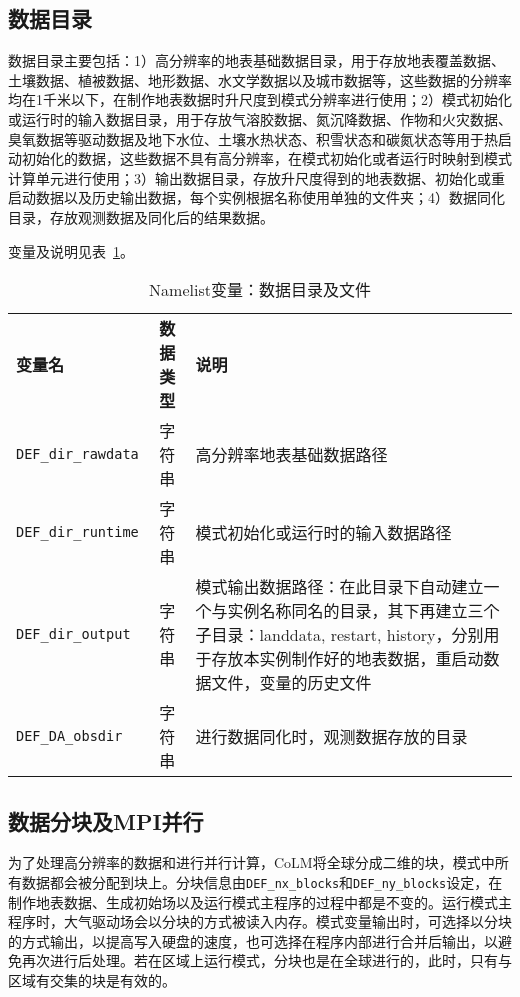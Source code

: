 \subsection{数据目录}

数据目录主要包括：1）高分辨率的地表基础数据目录，用于存放地表覆盖数据、土壤数据、植被数据、地形数据、水文学数据以及城市数据等，这些数据的分辨率均在1千米以下，在制作地表数据时升尺度到模式分辨率进行使用；2）模式初始化或运行时的输入数据目录，用于存放气溶胶数据、氮沉降数据、作物和火灾数据、臭氧数据等驱动数据及地下水位、土壤水热状态、积雪状态和碳氮状态等用于热启动初始化的数据，这些数据不具有高分辨率，在模式初始化或者运行时映射到模式计算单元进行使用；3）输出数据目录，存放升尺度得到的地表数据、初始化或重启动数据以及历史输出数据，每个实例根据名称使用单独的文件夹；4）数据同化目录，存放观测数据及同化后的结果数据。

变量及说明见表~\ref{table_nl_dir_file}。

\begin{table}[!htbp] \small
\caption{Namelist变量：数据目录及文件} \label{table_nl_dir_file}
\centering \renewcommand{\arraystretch}{1.2}
\begin{tabular}{lcp{}}
\toprule
\textbf{变量名} & \textbf{数据类型} & \textbf{说明} \\
\texttt{DEF\_dir\_rawdata} & 字符串 & 高分辨率地表基础数据路径 \\
\texttt{DEF\_dir\_runtime} & 字符串 & 模式初始化或运行时的输入数据路径 \\
\texttt{DEF\_dir\_output} & 字符串 & 模式输出数据路径：在此目录下自动建立一个与实例名称同名的目录，其下再建立三个子目录：landdata, restart, history，分别用于存放本实例制作好的地表数据，重启动数据文件，变量的历史文件 \\
\texttt{DEF\_DA\_obsdir} & 字符串 & 进行数据同化时，观测数据存放的目录 \\
\bottomrule
\end{tabular}
\end{table}

\subsection{数据分块及MPI并行}

为了处理高分辨率的数据和进行并行计算，CoLM将全球分成二维的块，模式中所有数据都会被分配到块上。分块信息由\texttt{DEF\_nx\_blocks}和\texttt{DEF\_ny\_blocks}设定，在制作地表数据、生成初始场以及运行模式主程序的过程中都是不变的。运行模式主程序时，大气驱动场会以分块的方式被读入内存。模式变量输出时，可选择以分块的方式输出，以提高写入硬盘的速度，也可选择在程序内部进行合并后输出，以避免再次进行后处理。若在区域上运行模式，分块也是在全球进行的，此时，只有与区域有交集的块是有效的。

